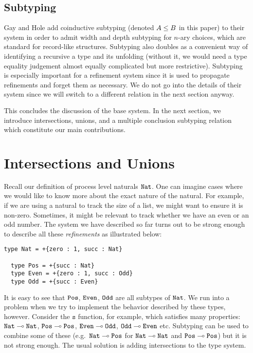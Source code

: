 \documentclass[a4paper,USenglish]{lipics-v2016}
\begin{document}
\subsection{Subtyping}
\label{original-subtyping}

Gay and Hole \cite{GayH05} add coinductive subtyping (denoted $A \le B$ in this paper) to their system in order to admit width and depth subtyping for $n$-ary choices, which are standard for record-like structures. Subtyping also doubles as a convenient way of identifying a recursive a type and its unfolding (without it, we would need a type equality judgement almost equally complicated but more restrictive). Subtyping is especially important for a refinement system since it is used to propagate refinements and forget them as necessary. We do not go into the details of their system since we will switch to a different relation in the next section anyway.

This concludes the discussion of the base system. In the next section, we introduce intersections, unions, and a multiple conclusion subtyping relation which constitute our main contributions.


\section{Intersections and Unions}
\label{refinements}

Recall our definition of process level naturals $\mathtt{Nat}$. One can imagine cases where we would like to know more about the exact nature of the natural. For example, if we are using a natural to track the size of a list, we might want to ensure it is non-zero. Sometimes, it might be relevant to track whether we have an even or an odd number. The system we have described so far turns out to be strong enough to describe all these \emph{refinements} as illustrated below:
\begin{lstlisting}[language=krill, style=custom]
  type Nat = +{zero : 1, succ : Nat}

  type Pos = +{succ : Nat}
  type Even = +{zero : 1, succ : Odd}
  type Odd = +{succ : Even}
\end{lstlisting}

It is easy to see that $\mathtt{Pos}$, $\mathtt{Even}$, $\mathtt{Odd}$ are all subtypes of $\mathtt{Nat}$. We run into a problem when we try to implement the behavior described by these types, however. Consider the $\mathtt{s}$ function, for example, which satisfies many properties: $\mathtt{Nat} \multimap \mathtt{Nat}$, $\mathtt{Pos} \multimap \mathtt{Pos}$, $\mathtt{Even} \multimap \mathtt{Odd}$, $\mathtt{Odd} \multimap \mathtt{Even}$ etc. Subtyping can be used to combine some of these (e.g.\ $\mathtt{Nat} \multimap \mathtt{Pos}$ for $\mathtt{Nat} \multimap \mathtt{Nat}$ and $\mathtt{Pos} \multimap \mathtt{Pos}$) but it is not strong enough. The usual solution is adding intersections to the type system.
\end{document}
